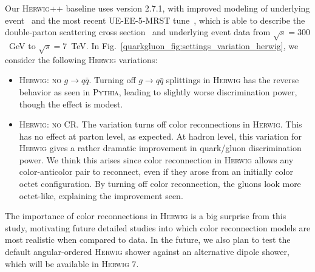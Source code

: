 \documentclass[11pt]{cernrep}
\begin{document}
Our \textsc{Herwig++} baseline uses version 2.7.1, with improved modeling of underlying event~\cite{Gieseke:2012ft} and the most recent UE-EE-5-MRST tune~\cite{Seymour:2013qka}, which is able to describe the double-parton scattering cross section~\cite{Bahr:2013gkj} and underlying event data from $\sqrt{s} = 300$~GeV to $\sqrt{s} = 7$~TeV.  In Fig.~\ref{quarkgluon_fig:settings_variation_herwig}, we consider the following  \textsc{Herwig} variations:
\begin{itemize}
\item \textsc{Herwig: no $g \to q\bar{q}$}.  Turning off $g \to q \bar{q}$ splittings in \textsc{Herwig} has the reverse behavior as seen in \textsc{Pythia}, leading to slightly worse discrimination power, though the effect is modest.
\item \textsc{Herwig: no CR}.  The variation turns off color reconnections in \textsc{Herwig}.  This has no effect at parton level, as expected.  At hadron level, this variation for \textsc{Herwig} gives a rather dramatic improvement in quark/gluon discrimination power.  We think this arises since color reconnection in \textsc{Herwig} allows any color-anticolor pair to reconnect, even if they arose from an initially color octet configuration.  By turning off color reconnection, the gluons look more octet-like, explaining the improvement seen.
\end{itemize}
The importance of color reconnections in \textsc{Herwig} is a big surprise from this study, motivating future detailed studies into which color reconnection models are most realistic when compared to data.  In the future, we also plan to test the default angular-ordered \textsc{Herwig} shower against an alternative dipole shower, which will be available in \textsc{Herwig 7}.
\end{document}
